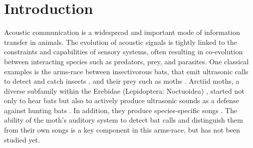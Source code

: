 \documentclass[12pt,a4paper]{article}
\begin{document}
\section{Introduction}
Acoustic communication is a widespread and important mode of information transfer in animals. The evolution of acoustic signals is tightly linked to the constraints and capabilities of sensory systems, often resulting in co-evolution between interacting species such as predators, prey, and parasites. One classical examples is the arms-race between insectivorous bats, that emit ultrasonic calls to detect and catch insects \parencite{schnitzler_echolocation_2001}, and their prey such as moths \parencite{acharya_bat_1999, waters_bats_2003, conner_sound_2012}. Arctiid moths, a diverse subfamily within the Erebidae (Lepidoptera: Noctuoidea) \parencite{boppré_ecological_2011, ratcliffe_adaptive_2005}, started not only to hear bats but also to actively produce ultrasonic sounds as a defense against hunting bats \parencite{corcoran_antibat_2010, corcoran_how_2011, corcoran_convergent_2014}. In addition, they produce species-specific songs \parencite{sanderford_courtship_1990, simmons_ultrasonic_1996, sanderford_courtship_1998, conner_ultrasound_1987}. The ability of the moth's auditory system to detect bat calls and distinguish them from their own songs is a key component in this arms-race, but has not been studied yet.


\end{document}
